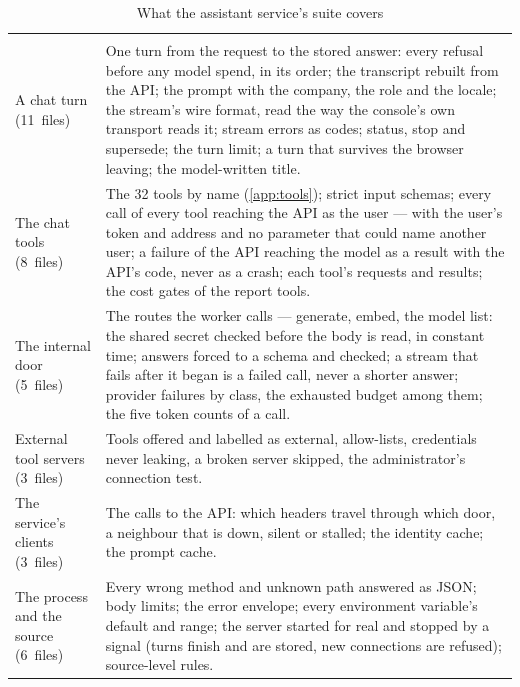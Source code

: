 \begin{xltabular}{\textwidth}{@{}L{31mm}Y@{}}
\caption{What the assistant service's suite covers}\label{tab:testing:assistant}\\
\toprule
{} &  \\
\midrule
\endfirsthead
\toprule
{} &  \\
\midrule
\endhead
\bottomrule
\endlastfoot
A chat turn (11~files) & One turn from the request to the stored answer: every refusal before
any model spend, in its order; the transcript rebuilt from the API; the prompt with the
company, the role and the locale; the stream's wire format, read the way the console's own
transport reads it; stream errors as codes; status, stop and supersede; the turn limit; a turn
that survives the browser leaving; the model-written title. \\
The chat tools (8~files) & The 32 tools by name (\cref{app:tools}); strict input schemas;
every call of every tool reaching the API as the user --- with the user's token and address
and no parameter that could name another user; a failure of the API reaching the model as a
result with the API's code, never as a crash; each tool's requests and results; the cost gates
of the report tools. \\
The internal door (5~files) & The routes the worker calls --- generate, embed, the model
list: the shared secret checked before the body is read, in constant time; answers forced to a
schema and checked; a stream that fails after it began is a failed call, never a shorter
answer; provider failures by class, the exhausted budget among them; the five token counts of
a call. \\
External tool servers (3~files) & Tools offered and labelled as external, allow-lists,
credentials never leaking, a broken server skipped, the administrator's connection test. \\
The service's clients (3~files) & The calls to the API: which headers travel through which
door, a neighbour that is down, silent or stalled; the identity cache; the prompt cache. \\
The process and the source (6~files) & Every wrong method and unknown path answered as JSON;
body limits; the error envelope; every environment variable's default and range; the server
started for real and stopped by a signal (turns finish and are stored, new connections are
refused); source-level rules. \\
\end{xltabular}

